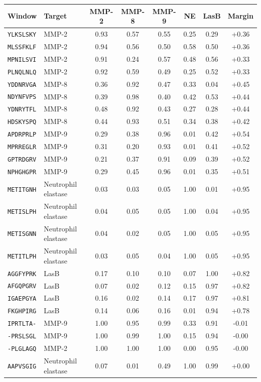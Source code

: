 \begin{tabular}{@{}llccccc c@{}}\toprule
Window & Target & MMP-2 & MMP-8 & MMP-9 & NE & LasB & Margin \\\midrule
\texttt{YLKSLSKY} & MMP-2 & 0.93 & 0.57 & 0.55 & 0.25 & 0.29 & +0.36 \\
\texttt{MLSSFKLF} & MMP-2 & 0.94 & 0.56 & 0.50 & 0.58 & 0.50 & +0.36 \\
\texttt{MPNILSVI} & MMP-2 & 0.91 & 0.24 & 0.57 & 0.48 & 0.56 & +0.33 \\
\texttt{PLNQLNLQ} & MMP-2 & 0.92 & 0.59 & 0.49 & 0.25 & 0.52 & +0.33 \\
\texttt{YDDNRVGA} & MMP-8 & 0.36 & 0.92 & 0.47 & 0.33 & 0.04 & +0.45 \\
\texttt{NDYNFVPS} & MMP-8 & 0.39 & 0.98 & 0.40 & 0.42 & 0.53 & +0.44 \\
\texttt{YDNRYTFL} & MMP-8 & 0.48 & 0.92 & 0.43 & 0.27 & 0.28 & +0.44 \\
\texttt{HDSKYSPQ} & MMP-8 & 0.44 & 0.93 & 0.51 & 0.34 & 0.38 & +0.42 \\
\texttt{APDRPRLP} & MMP-9 & 0.29 & 0.38 & 0.96 & 0.01 & 0.42 & +0.54 \\
\texttt{MPRREGLR} & MMP-9 & 0.31 & 0.20 & 0.93 & 0.01 & 0.41 & +0.52 \\
\texttt{GPTRDGRV} & MMP-9 & 0.21 & 0.37 & 0.91 & 0.09 & 0.39 & +0.52 \\
\texttt{NPHGHGPR} & MMP-9 & 0.29 & 0.45 & 0.96 & 0.01 & 0.35 & +0.51 \\
\texttt{METITGNH} & Neutrophil elastase & 0.03 & 0.03 & 0.05 & 1.00 & 0.01 & +0.95 \\
\texttt{METISLPH} & Neutrophil elastase & 0.04 & 0.05 & 0.05 & 1.00 & 0.04 & +0.95 \\
\texttt{METISGNN} & Neutrophil elastase & 0.04 & 0.02 & 0.05 & 1.00 & 0.05 & +0.95 \\
\texttt{METITLPH} & Neutrophil elastase & 0.03 & 0.05 & 0.04 & 1.00 & 0.05 & +0.95 \\
\texttt{AGGFYPRK} & LasB & 0.17 & 0.10 & 0.10 & 0.07 & 1.00 & +0.82 \\
\texttt{AFGQPGRV} & LasB & 0.07 & 0.02 & 0.12 & 0.15 & 0.97 & +0.82 \\
\texttt{IGAEPGYA} & LasB & 0.16 & 0.02 & 0.14 & 0.17 & 0.97 & +0.81 \\
\texttt{FKGHPIRG} & LasB & 0.14 & 0.06 & 0.16 & 0.01 & 0.94 & +0.78 \\
\midrule
\texttt{IPRTLTA-} & MMP-9 & 1.00 & 0.95 & 0.99 & 0.33 & 0.91 & -0.01 \\
\texttt{-PRSLSGL} & MMP-9 & 1.00 & 0.99 & 1.00 & 0.15 & 0.94 & -0.00 \\
\texttt{-PLGLAGQ} & MMP-2 & 1.00 & 1.00 & 1.00 & 0.00 & 0.95 & -0.00 \\
\texttt{AAPVSGIG} & Neutrophil elastase & 0.07 & 0.01 & 0.49 & 1.00 & 0.99 & +0.00 \\
\bottomrule\end{tabular}
